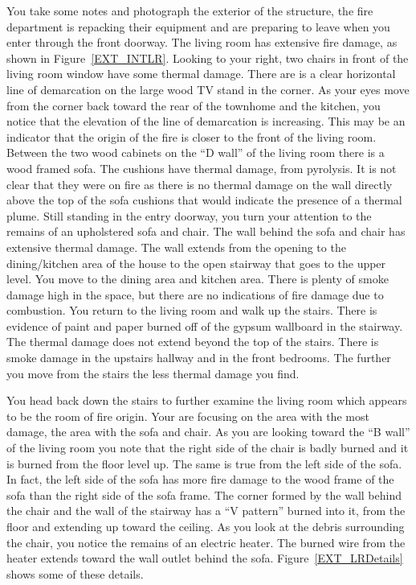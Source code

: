 \documentclass[twoside]{uocthesis}
\begin{document}
{You take some notes and photograph the exterior of the structure, the fire department is repacking their equipment and are preparing to leave when you enter through the front doorway.  The living room has extensive fire damage, as shown in Figure~\ref{EXT_INTLR}.  Looking to your right, two chairs in front of the living room window have some thermal damage.  There are is a clear horizontal line of demarcation on the large wood TV stand in the corner.  As your eyes move from the corner back toward the rear of the townhome and the kitchen, you notice that the elevation of the line of demarcation is increasing.  This may be an indicator that the origin of the fire is closer to the front of the living room.  Between the two wood cabinets on the ``D wall'' of the living room there is a wood framed sofa.  The cushions have thermal damage, from pyrolysis.  It is not clear that they were on fire as there is no thermal damage on the wall directly above the top of the sofa cushions that would indicate the presence of a thermal plume.  Still standing in the entry doorway, you turn your attention to the remains of an upholstered sofa and chair.  The wall behind the sofa and chair has extensive thermal damage.  The wall extends from the opening to the dining/kitchen area of the house to the open stairway that goes to the upper level.  You move to the dining area and kitchen area.  There is plenty of smoke damage high in the space, but there are no indications of fire damage due to combustion.  You return to the living room and walk up the stairs.  There is evidence of paint and paper burned off of the gypsum wallboard in the stairway.  The thermal damage does not extend beyond the top of the stairs.  There is smoke damage in the upstairs hallway and in the front bedrooms. The further you move from the stairs the less thermal damage you find.  

You head back down the stairs to further examine the living room which appears to be the room of fire origin. Your are focusing on the area with the most damage, the area with the sofa and chair.  As you are looking toward the ``B wall'' of the living room you note that the right side of the chair is badly burned and it is burned from the floor level up.  The same is true from the left side of the sofa.  In fact, the left side of the sofa has more fire damage to the wood frame of the sofa than the right side of the sofa frame.  The corner formed by the wall behind the chair and the wall of the stairway has a ``V pattern'' burned into it, from the floor and extending up toward the ceiling.  As you look at the debris surrounding the chair, you notice the remains of an electric heater.  The burned wire from the heater extends toward the wall outlet behind the sofa. Figure~\ref{EXT_LRDetails} shows some of these details.

}
\end{document}
